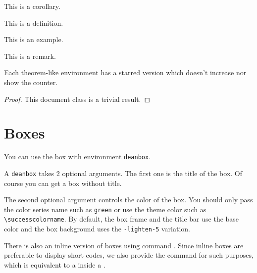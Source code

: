 \documentclass[showbib, lang=en]{DeanReport}
\begin{document}
\begin{corollary}
    This is a corollary.
\end{corollary}

\begin{definition}
    This is a definition.
\end{definition}

\begin{example}
    This is an example.
\end{example}

\begin{remark}
    This is a remark.
\end{remark}

\begin{remark*}
    Each theorem-like environment has a starred version which doesn't increase nor show the counter.
\end{remark*}

\begin{proof}
    This document class is a trivial result.
\end{proof}

\section{Boxes}
\label{sec:boxes}
\begin{deanbox}
    You can use the box with environment \verb|deanbox|.
\end{deanbox}

\begin{deanbox}[]
    A \verb|deanbox| takes 2 optional arguments. The first one is the title of the box. Of course you can get a box without title.
\end{deanbox}

\begin{deanbox}
    The second optional argument controls the color of the box. You should only pass the color series name such as \verb|green| or use the theme color such as \verb|\successcolorname|. By default, the box frame and the title bar use the base color and the box background uses the \verb|-lighten-5| variation.
\end{deanbox}

There is also an inline version of boxes using command . Since inline boxes are preferable to display short codes, we also provide the command  for such purposes, which is equivalent to a  inside a .
\end{document}
